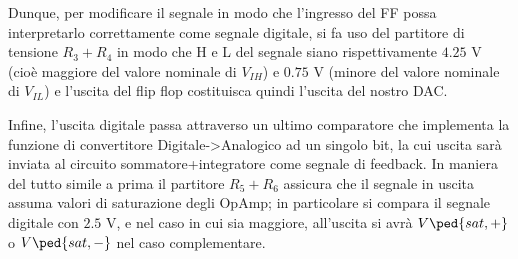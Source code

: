 \documentclass[10pt, a4paper, italian]{article}
\begin{document}
Dunque, per modificare il segnale in modo che l'ingresso del FF possa
interpretarlo correttamente come segnale digitale, si fa uso del partitore di
tensione $R_3 + R_4$ in modo che H e L del segnale siano rispettivamente
$4.25$ V (cioè maggiore del valore nominale di $V_{IH}$) e $0.75$ V
(minore del valore nominale di $V_{IL}$) e l'uscita del flip flop costituisca
quindi l'uscita del nostro DAC.

Infine, l'uscita digitale passa attraverso un ultimo comparatore che implementa
la funzione di convertitore Digitale->Analogico ad un singolo bit, la cui
uscita sarà inviata al circuito sommatore+integratore come segnale di feedback.
In maniera del tutto simile a prima il partitore $R_5 + R_6$ assicura che
il segnale in uscita assuma valori di saturazione degli OpAmp; in particolare
si compara il segnale digitale con $2.5$ V, e nel caso in cui sia maggiore,
all'uscita si avrà $V\ped{sat,+}$ o $V\ped{sat,-}$ nel caso complementare.
\end{document}
